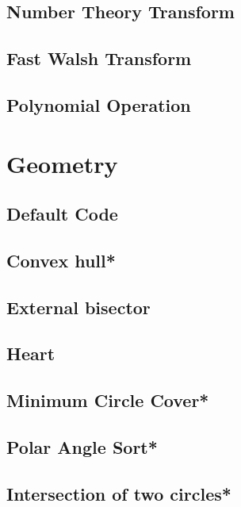 \subsection{Number Theory Transform}

\subsection{Fast Walsh Transform}

\subsection{Polynomial Operation}



\section{Geometry}
\subsection{Default Code}

\subsection{Convex hull*} %

\subsection{External bisector}

\subsection{Heart}

\subsection{Minimum Circle Cover*} %

\subsection{Polar Angle Sort*} %

\subsection{Intersection of two circles*} %

